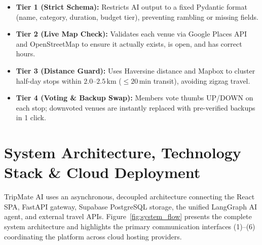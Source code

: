 \documentclass[11pt,a4paper]{article}
\begin{document}
\begin{itemize}[leftmargin=1.2em]
\item \textbf{Tier 1 (Strict Schema):} Restricts AI output to a fixed Pydantic format (name, category, duration, budget tier), preventing rambling or missing fields.
\item \textbf{Tier 2 (Live Map Check):} Validates each venue via Google Places API and OpenStreetMap to ensure it actually exists, is open, and has correct hours.
\item \textbf{Tier 3 (Distance Guard):} Uses Haversine distance and Mapbox to cluster half-day stops within $2.0$--$2.5$\,km ($\le 20$\,min transit), avoiding zigzag travel.
\item \textbf{Tier 4 (Voting \& Backup Swap):} Members vote thumbs UP/DOWN on each stop; downvoted venues are instantly replaced with pre-verified backups in 1 click.
\end{itemize}

\section{System Architecture, Technology Stack \& Cloud Deployment}

TripMate AI uses an asynchronous, decoupled architecture connecting the React SPA, FastAPI gateway, Supabase PostgreSQL storage, the unified LangGraph AI agent, and external travel APIs. Figure~\ref{fig:system_flow} presents the complete system architecture and highlights the primary communication interfaces (1)--(6) coordinating the platform across cloud hosting providers.
\end{document}
